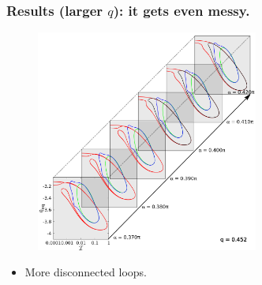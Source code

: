 \documentclass{beamer}
\newcommand{\bi}{\begin{itemize}}
\newcommand{\ei}{\end{itemize}}
\begin{document}
\begin{frame}
	\frametitle{Results (larger $q$): it gets even messy.}
	\begin{overlayarea}{\textwidth}{\textheight}\vspace{-0.3cm}
		\begin{figure}[htb]
			\begin{center}
				\includegraphics[width=0.65\textwidth]{plots/elastic_beam_I_theta_q_0.452_alpha_restart3.png}
			\end{center}
		\end{figure}\vspace{-0.3cm}
		\bi
		\item More disconnected loops.
		\ei 
	\end{overlayarea}
\end{frame}

\end{document}
